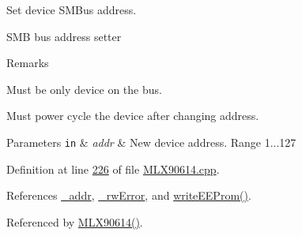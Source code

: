 Set device S\+M\+Bus address. 

S\+MB bus address setter

\begin{DoxyRemark}{Remarks}
\begin{DoxyItemize}
\item Must be only device on the bus. \item Must power cycle the device after changing address. \end{DoxyItemize}

\end{DoxyRemark}

\begin{DoxyParams}[1]{Parameters}
\mbox{\tt in}  & {\em addr} & New device address. Range 1...127 \\
\hline
\end{DoxyParams}


Definition at line \mbox{\hyperlink{_m_l_x90614_8cpp_source_l00226}{226}} of file \mbox{\hyperlink{_m_l_x90614_8cpp_source}{M\+L\+X90614.\+cpp}}.



References \mbox{\hyperlink{_m_l_x90614_8h_source_l00145}{\+\_\+addr}}, \mbox{\hyperlink{_m_l_x90614_8h_source_l00146}{\+\_\+rw\+Error}}, and \mbox{\hyperlink{_m_l_x90614_8cpp_source_l00354}{write\+E\+E\+Prom()}}.



Referenced by \mbox{\hyperlink{_m_l_x90614_8cpp_source_l00046}{M\+L\+X90614()}}.



